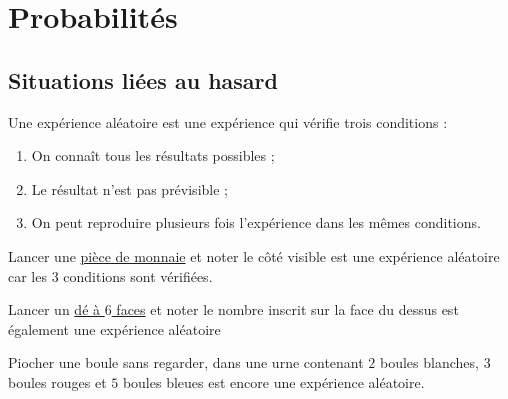 \documentclass[a4paper,10pt]{report}
\begin{document}
\newpage
\setcounter{chapter}{15}
\chapter{Probabilités}



\vspace{-3mm}
\section{Situations liées au hasard}

\vspace{-4mm}
\begin{defn}
Une expérience aléatoire est une expérience qui vérifie trois conditions :
\begin{enumerate}
\item On connaît tous les résultats possibles ;
\item Le résultat n'est pas prévisible ;
\item On peut reproduire plusieurs fois l'expérience dans les mêmes conditions.
\end{enumerate} 
\end{defn}

\begin{ex}
\vspace{-4.5mm}\hspace{2.8cm} Lancer une \href{https://fr.piliapp.com/random/coin/}{pièce de monnaie} et noter le côté visible est une expérience aléatoire car les $3$ conditions sont vérifiées.
\end{ex}

\vspace{-1mm}
\begin{ex}
\vspace{-4.5mm}\hspace{2.8cm} Lancer un \href{https://fr.piliapp.com/random/dice/}{dé à $6$ faces} et noter le nombre inscrit sur la face du dessus est également une expérience aléatoire
\end{ex}

\vspace{-1mm}
\begin{ex}
\vspace{-4.5mm}\hspace{2.8cm} Piocher une boule sans regarder, dans une urne contenant $2$ boules blanches, $3$ boules rouges et $5$ boules bleues est encore une expérience aléatoire.
\end{ex}
\end{document}
